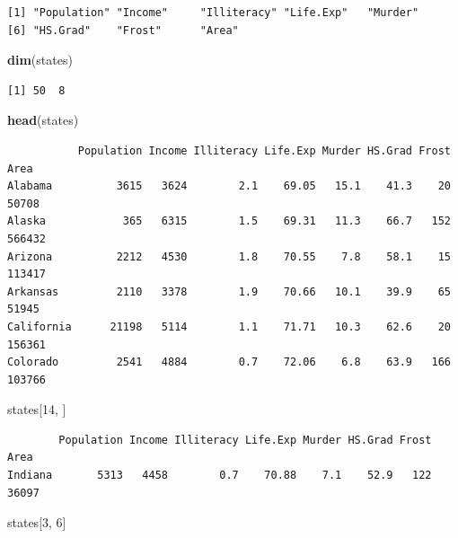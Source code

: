 \documentclass[
]{book}
\newenvironment{Shaded}{\begin{snugshade}}{\end{snugshade}}
\newcommand{\DecValTok}[1]{\textcolor[rgb]{0.00,0.00,0.81}{#1}}
\newcommand{\KeywordTok}[1]{\textcolor[rgb]{0.13,0.29,0.53}{\textbf{#1}}}
\newcommand{\NormalTok}[1]{#1}
\begin{document}
\begin{verbatim}
[1] "Population" "Income"     "Illiteracy" "Life.Exp"   "Murder"    
[6] "HS.Grad"    "Frost"      "Area"      
\end{verbatim}

\begin{Shaded}
\begin{Highlighting}[]
\KeywordTok{dim}\NormalTok{(states)}
\end{Highlighting}
\end{Shaded}

\begin{verbatim}
[1] 50  8
\end{verbatim}

\begin{Shaded}
\begin{Highlighting}[]
\KeywordTok{head}\NormalTok{(states)}
\end{Highlighting}
\end{Shaded}

\begin{verbatim}
           Population Income Illiteracy Life.Exp Murder HS.Grad Frost   Area
Alabama          3615   3624        2.1    69.05   15.1    41.3    20  50708
Alaska            365   6315        1.5    69.31   11.3    66.7   152 566432
Arizona          2212   4530        1.8    70.55    7.8    58.1    15 113417
Arkansas         2110   3378        1.9    70.66   10.1    39.9    65  51945
California      21198   5114        1.1    71.71   10.3    62.6    20 156361
Colorado         2541   4884        0.7    72.06    6.8    63.9   166 103766
\end{verbatim}

\begin{Shaded}
\begin{Highlighting}[]
\NormalTok{states[}\DecValTok{14}\NormalTok{, ]}
\end{Highlighting}
\end{Shaded}

\begin{verbatim}
        Population Income Illiteracy Life.Exp Murder HS.Grad Frost  Area
Indiana       5313   4458        0.7    70.88    7.1    52.9   122 36097
\end{verbatim}

\begin{Shaded}
\begin{Highlighting}[]
\NormalTok{states[}\DecValTok{3}\NormalTok{, }\DecValTok{6}\NormalTok{]}
\end{Highlighting}
\end{Shaded}
\end{document}
